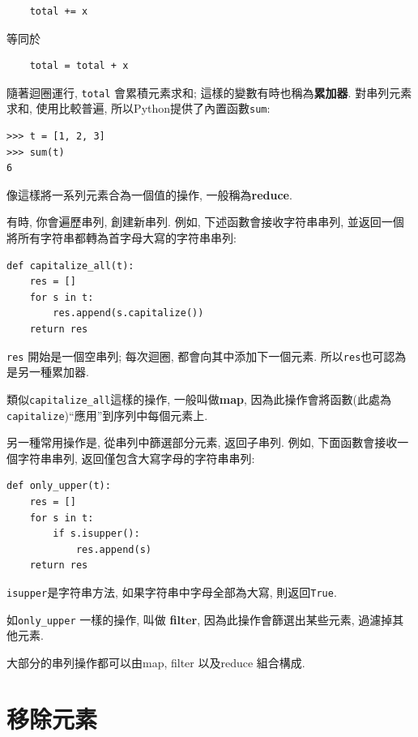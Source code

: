 \documentclass[10pt]{book}
\begin{document}
\begin{verbatim}
    total += x
\end{verbatim}
%
等同於

\begin{verbatim}
    total = total + x
\end{verbatim}
%
隨著迴圈運行, {\tt total} 會累積元素求和;
這樣的變數有時也稱為{\bf 累加器}. 
對串列元素求和, 使用比較普遍, 所以Python提供了內置函數{\tt sum}:

\begin{verbatim}
>>> t = [1, 2, 3]
>>> sum(t)
6
\end{verbatim}
%
像這樣將一系列元素合為一個值的操作, 一般稱為{\bf reduce}.

有時, 你會遍歷串列, 創建新串列. 例如, 下述函數會接收字符串串列, 
並返回一個將所有字符串都轉為首字母大寫的字符串串列:

\begin{verbatim}
def capitalize_all(t):
    res = []
    for s in t:
        res.append(s.capitalize())
    return res
\end{verbatim}
%
{\tt res} 開始是一個空串列; 每次迴圈, 都會向其中添加下一個元素. 
所以{\tt res}也可認為是另一種累加器. 

類似\verb"capitalize_all"這樣的操作, 一般叫做{\bf map}, 
因為此操作會將函數(此處為{\tt capitalize})``應用''到序列中每個元素上. 

另一種常用操作是, 從串列中篩選部分元素, 返回子串列. 例如, 
下面函數會接收一個字符串串列, 返回僅包含大寫字母的字符串串列:

\begin{verbatim}
def only_upper(t):
    res = []
    for s in t:
        if s.isupper():
            res.append(s)
    return res
\end{verbatim}
%
{\tt isupper}是字符串方法, 如果字符串中字母全部為大寫, 則返回{\tt True}. 

如\verb"only_upper" 一樣的操作, 叫做 {\bf filter}, 因為此操作會篩選出某些元素, 
過濾掉其他元素. 

大部分的串列操作都可以由map, filter 以及reduce 組合構成. 


\section{移除元素}
\end{document}
